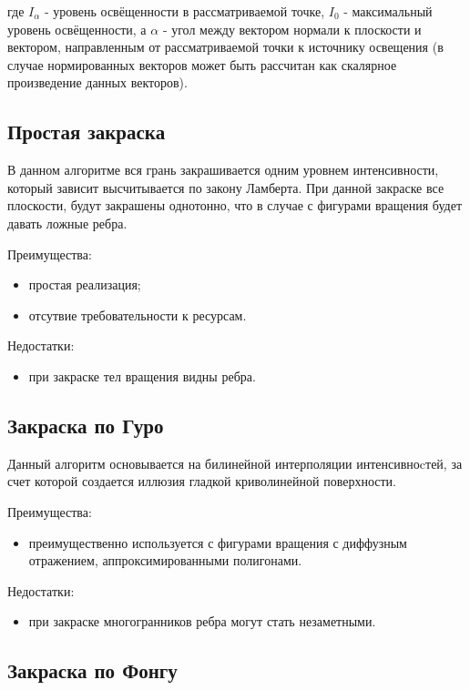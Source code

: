 где $I_{\alpha}$ - уровень освёщенности в рассматриваемой точке, $I_0$ -
максимальный уровень освёщенности, а $\alpha$ - угол между вектором нормали к
плоскости и вектором, направленным от рассматриваемой точки к источнику
освещения (в случае нормированных векторов может быть рассчитан как скалярное
произведение данных векторов).

\subsection{Простая закраска}

В данном алгоритме вся грань закрашивается одним уровнем интенсивности, который
зависит высчитывается по закону Ламберта. При данной закраске все плоскости,
будут закрашены однотонно, что в случае с фигурами вращения будет давать ложные
ребра.

Преимущества:
\begin{itemize}
    \item простая реализация;
    \item отсутвие требовательности к ресурсам.
\end{itemize}

Недостатки:
\begin{itemize}
    \item при закраске тел вращения видны ребра.
\end{itemize}

\subsection{Закраска по Гуро}

Данный алгоритм основывается на билинейной интерполяции интенсивноcтей, за счет
которой создается иллюзия гладкой криволинейной поверхности.

Преимущества:
\begin{itemize}
    \item преимущественно используется с фигурами вращения с диффузным
        отражением, аппроксимированными полигонами.
\end{itemize}

Недостатки:
\begin{itemize}
    \item при закраске многогранников ребра могут стать незаметными.
\end{itemize}

\subsection{Закраска по Фонгу}

